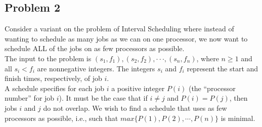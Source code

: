 \documentclass[11pt]{article}
\begin{document}
\subsection*{Problem 2}
Consider a variant on the problem of Interval Scheduling where instead of wanting to schedule as many jobs as we can on one processor, we now want to schedule ALL of the jobs on as few processors as possible.\\
The input to the problem is $(s_1,f_1), (s_2,f_2), ···, (s_n,f_n)$, where $n \geq 1$ and all $s_i < f_i$ are nonnegative integers. The integers $s_i$ and $f_i$ represent the start and finish times, respectively, of job $i$.\\
A schedule specifies for each job $i$ a positive integer $P(i)$ (the “processor number” for job $i$). It must be the case that if $i \neq j$ and $P(i) = P(j)$, then jobs $i$ and $j$ do not overlap. We wish to find a schedule that uses as few processors as possible, i.e., such that $max\{P(1), P(2), \cdots , P(n)\}$ is minimal.\\
\end{document}
